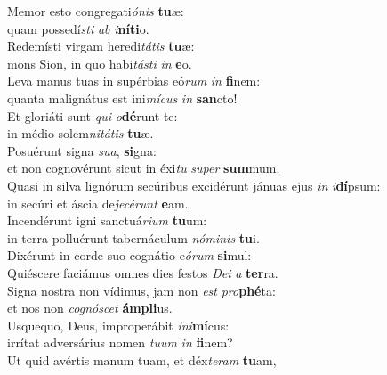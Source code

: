 \evenverse Memor esto congregati\textit{ó}\textit{nis} \textbf{tu}æ:~\*\\
\evenverse quam possedí\textit{sti} \textit{ab} \textit{i}\textbf{ní}\textbf{ti}o.\\
\oddverse Redemísti virgam heredi\textit{tá}\textit{tis} \textbf{tu}æ:~\*\\
\oddverse mons Sion, in quo habi\textit{tá}\textit{sti} \textit{in} \textbf{e}o.\\
\evenverse Leva manus tuas in supérbias eó\textit{rum} \textit{in} \textbf{fi}nem:~\*\\
\evenverse quanta malignátus est ini\textit{mí}\textit{cus} \textit{in} \textbf{san}cto!\\
\oddverse Et gloriáti sunt \textit{qui} \textit{o}\textbf{dé}runt te:~\*\\
\oddverse in médio solem\textit{ni}\textit{tá}\textit{tis} \textbf{tu}æ.\\
\evenverse Posuérunt signa \textit{su}\textit{a}, \textbf{si}gna:~\*\\
\evenverse et non cognovérunt sicut in éxi\textit{tu} \textit{su}\textit{per} \textbf{sum}mum.\\
\oddverse Quasi in silva lignórum secúribus excidérunt jánuas ejus \textit{in} \textit{i}\textbf{dí}psum:~\*\\
\oddverse in secúri et áscia de\textit{je}\textit{cé}\textit{runt} \textbf{e}am.\\
\evenverse Incendérunt igni sanctuá\textit{ri}\textit{um} \textbf{tu}um:~\*\\
\evenverse in terra polluérunt tabernáculum \textit{nó}\textit{mi}\textit{nis} \textbf{tu}i.\\
\oddverse Dixérunt in corde suo cognátio e\textit{ó}\textit{rum} \textbf{si}mul:~\*\\
\oddverse Quiéscere faciámus omnes dies festos \textit{De}\textit{i} \textit{a} \textbf{ter}ra.\\
\evenverse Signa nostra non vídimus, jam non \textit{est} \textit{pro}\textbf{phé}ta:~\*\\
\evenverse et nos non \textit{co}\textit{gnó}\textit{scet} \textbf{ám}\textbf{pli}us.\\
\oddverse Usquequo, Deus, improperábit \textit{i}\textit{ni}\textbf{mí}cus:~\*\\
\oddverse irrítat adversárius nomen \textit{tu}\textit{um} \textit{in} \textbf{fi}nem?\\
\evenverse Ut quid avértis manum tuam, et déx\textit{te}\textit{ram} \textbf{tu}am,~\*\\
